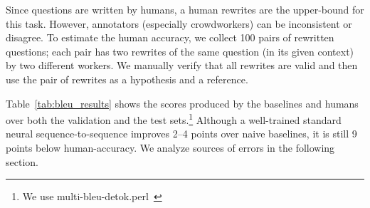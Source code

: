 Since questions are written by humans, a human rewrites are the
upper-bound for this task.
However, annotators (especially crowdworkers) can be inconsistent or
disagree.
To estimate the human accuracy, we collect 100 pairs of rewritten questions; each pair
has two rewrites of the same question (in its given context) by two different workers.
We manually verify that all rewrites are valid and then use the pair of rewrites as a hypothesis and a reference.  



Table~\ref{tab:bleu_results} shows the  scores produced by the baselines
and humans over both the validation and the test sets.\footnote{We use multi-bleu-detok.perl~\cite{sennrich2017nematus}}
Although a well-trained standard neural sequence-to-sequence improves
2--4  points over naive baselines, it is still 9  points below human-accuracy.  
We analyze sources of errors in the following section.



